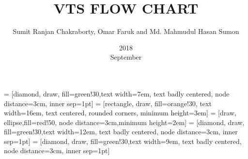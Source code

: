 \documentclass[10pt,legal]{article}
\title{VTS FLOW CHART}
\date {2018 \\ September}
\author{Sumit Ranjan Chakraborty, Omar Faruk and Md. Mahmudul Hasan Sumon}
\begin{document}
\pagestyle{empty}
\maketitle
{}
 = [diamond, draw, fill=green!30,text width=7em, text badly centered, node distance=3cm, inner sep=1pt]
 = [rectangle, draw, fill=orange!30, text width=16em, text centered, rounded corners, minimum height=3em]
 = [draw, ellipse,fill=red!50, node distance=3cm,minimum height=2em]
 = [diamond, draw, fill=green!30,text width=12em, text badly centered, node distance=3cm, inner sep=1pt]
 = [diamond, draw, fill=green!30,text width=9em, text badly centered, node distance=3cm, inner sep=1pt]
\end{document}
